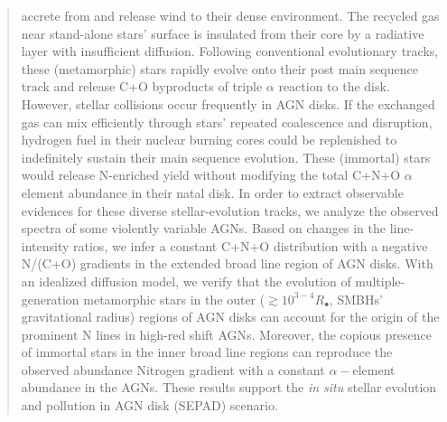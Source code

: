 \documentclass[linenumbers,trackchanges]{aastex701}
\begin{document}
\begin{CJK*}{UTF8}{ipxm}
\begin{abstract}
accrete from and release wind to their 
dense environment.  The recycled gas near
stand-alone stars' surface is insulated from their
core by a radiative layer with insufficient diffusion.  
Following conventional evolutionary tracks, these 
(metamorphic) stars rapidly evolve onto their 
post main sequence track and release C+O byproducts 
of triple $\alpha$ reaction to the disk. However,
stellar collisions occur frequently in AGN disks.
If the exchanged gas can mix efficiently through 
stars' repeated coalescence and disruption, hydrogen 
fuel in their nuclear burning cores could be replenished 
to indefinitely sustain their main sequence evolution.
These (immortal) stars would release N-enriched yield 
without modifying the total C+N+O $\alpha$ element 
abundance in their natal disk. In order to extract 
observable evidences for these diverse stellar-evolution 
tracks, we analyze the observed spectra of some 
violently variable AGNs. Based on changes in the
line-intensity ratios, we infer a constant C+N+O 
distribution with a negative N/(C+O) gradients in 
the extended broad line region of AGN disks. With 
an idealized diffusion model, we verify that the 
evolution of multiple-generation metamorphic stars 
in the outer ($\gtrsim 10^{3-4} R_{\bullet}$, SMBHs' 
gravitational radius) regions of AGN disks can account 
for the origin of the prominent N lines in high-red 
shift AGNs.  Moreover, the copious presence of 
immortal stars in the inner broad line regions 
can reproduce the observed abundance Nitrogen gradient 
with a constant $\alpha-$element abundance in the 
AGNs.  These results support the {\it in situ} 
stellar evolution and pollution in AGN disk (SEPAD) 
scenario.
\end{abstract}



\end{CJK*}
\end{document}
